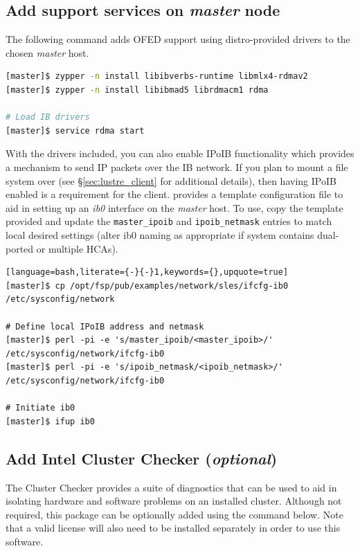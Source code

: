 \documentclass[letterpaper]{article}
\begin{document}
\newpage
\subsection{Add \InfiniBand{} support services on {\em master} node} \label{sec:add_ofed}

The following command adds OFED support using distro-provided drivers to the
chosen {\em master} host. 

\begin{lstlisting}[language=bash,keywords={}]
[master]$ zypper -n install libibverbs-runtime libmlx4-rdmav2
[master]$ zypper -n install libibmad5 librdmacm1 rdma

# Load IB drivers
[master]$ service rdma start
\end{lstlisting}

With the \InfiniBand{} drivers included, you can also enable IPoIB functionality
which provides a mechanism to send IP packets over the IB network. If you plan
to mount a \Lustre{} file system over \InfiniBand{} (see \S\ref{sec:lustre_client}
for additional details), then having IPoIB enabled is a requirement for the
\Lustre{} client. \FSP{} provides a template configuration file to aid in setting up
an {\em ib0} interface on the {\em master} host. To use, copy the template
provided and update the \texttt{master\_ipoib} and
\texttt{ipoib\_netmask} entries to match local desired settings (alter ib0
naming as appropriate if system contains dual-ported or multiple HCAs). 

\begin{lstlisting}[language=bash,literate={-}{-}1,keywords={},upquote=true]
[master]$ cp /opt/fsp/pub/examples/network/sles/ifcfg-ib0 /etc/sysconfig/network

# Define local IPoIB address and netmask
[master]$ perl -pi -e 's/master_ipoib/<master_ipoib>/' /etc/sysconfig/network/ifcfg-ib0
[master]$ perl -pi -e 's/ipoib_netmask/<ipoib_netmask>/' /etc/sysconfig/network/ifcfg-ib0

# Initiate ib0
[master]$ ifup ib0
\end{lstlisting}

\subsection{Add Intel Cluster Checker ({\em optional})} \label{sec:add_clck}

The \Intel{} Cluster Checker provides a suite of diagnostics that can be used to
aid in isolating hardware and software problems on an installed
cluster. Although not required, this package can be optionally added using the
command below. Note that a valid license will also need to be installed
separately in order to use this software.
\end{document}
